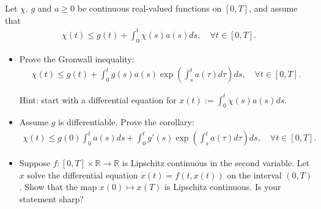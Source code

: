 \documentclass[12pt,a4paper]{article}
\newcommand{\from}{\colon}
\begin{document}
    Let $\chi$, $g$ and $a \geq 0$ be continuous real-valued
    functions on $[0, T]$, and assume that
    \begin{align}
        \chi(t) 
        \leq 
        g(t) +
        \int_0^t \chi(s) a(s) ds
        ,
        \quad
        \forall t \in [0, T]
        .
    \end{align}
    \begin{itemize}
    \item 
        Prove the Gronwall inequality:
        \begin{align}
            \chi(t) 
            \leq
            g(t) +
            \int_0^t 
                g(s)
                a(s)
                \exp \left( \int_s^t a(\tau) d\tau \right)
            ds,
            \quad
            \forall t \in [0, T].
        \end{align}
        
        Hint:
        start with a differential equation for 
        $x(t) := \int_0^t \chi(s) a(s) ds$.
    \item
        Assume $g$ is differentiable.
        Prove the corollary:
        \begin{align}
            \chi(t) 
            \leq 
            g(0) \int_0^t a(s) ds
            +
            \int_0^t g'(s) 
            \exp \left(
                \int_s^t a(\tau) d\tau
            \right)
            ds
            ,
            \quad
            \forall t \in [0, T].
        \end{align}
    \item
        Suppose $f \from [0, T] \times \mathbb{R} \to \mathbb{R}$
        is Lipschitz continuous in the second variable.
        Let $x$ solve the differential equation 
        $\dot{x}(t) = f(t, x(t))$ on the interval $(0, T)$.
        Show that the map
        $x(0) \mapsto x(T)$
        is Lipschitz continuous.
        Is your statement sharp?
    \end{itemize}
    
    
    
    \subsection{}
\end{document}
